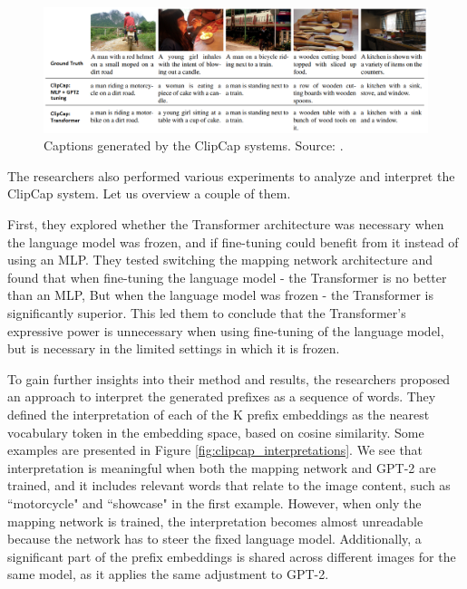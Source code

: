 \documentclass{article}
\begin{document}
\begin{figure}[ht!]
    \begin{center}
        \includegraphics[clip, width=1.0\textwidth]{figures/clipcap_generations.png}
    \end{center}
    \caption{
        Captions generated by the ClipCap systems. Source: \citet{mokady2021clipcap}.
    }
    \label{fig:clipcap_generations}
\end{figure}

\noindent
The researchers also performed various experiments to analyze and interpret the ClipCap system. Let us overview a couple of them.

\medskip
\noindent
First, they explored whether the Transformer architecture was necessary when the language model was frozen, and if fine-tuning could benefit from it instead of using an MLP. They tested switching the mapping network architecture and found that when fine-tuning the language model - the Transformer is no better than an MLP, But when the language model was frozen -  the Transformer is significantly superior. This led them to conclude that the Transformer's expressive power is unnecessary when using fine-tuning of the language model, but is necessary in the limited settings in which it is frozen.

\medskip
\noindent
To gain further insights into their method and results, the researchers proposed an approach to interpret the generated prefixes as a sequence of words. They defined the interpretation of each of the K prefix embeddings as the nearest vocabulary token in the embedding space, based on cosine similarity. Some examples are presented in Figure \ref{fig:clipcap_interpretations}. We see that interpretation is meaningful when both the mapping network and GPT-2 are trained, and it includes relevant words that relate to the image content, such as ``motorcycle" and ``showcase" in the first example. However, when only the mapping network is trained, the interpretation becomes almost unreadable because the network has to steer the fixed language model. Additionally, a significant part of the prefix embeddings is shared across different images for the same model, as it applies the same adjustment to GPT-2.
\end{document}
